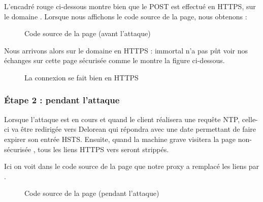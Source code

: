 L'encadré rouge ci-dessous montre bien que le POST est effectué en HTTPS, sur le domaine . Lorsque nous affichons le code source de la page, nous obtenons :

\begin{figure}[H]
  \caption{Code source de la page (avant l'attaque)}
\end{figure}

Nous arrivons alors sur le domaine  en HTTPS : immortal n'a pas pût voir nos échanges sur cette page sécurisée comme le montre la figure ci-dessous.

\begin{figure}[H]
  \caption{La connexion se fait bien en HTTPS}
\end{figure}

\subsubsection{Étape 2 : pendant l'attaque}

Lorsque l'attaque est en cours et quand le client réalisera une requête NTP, celle-ci va être redirigée vers Delorean qui répondra avec une date permettant de faire expirer son entrée HSTS. Ensuite, quand la machine grave visitera la page non-sécurisée , tous les liens HTTPS vers  seront strippés.

Ici on voit dans le code source de la page que notre proxy a remplacé les liens  par .

\begin{figure}[H]
  \caption{Code source de la page (pendant l'attaque)}
\end{figure}

